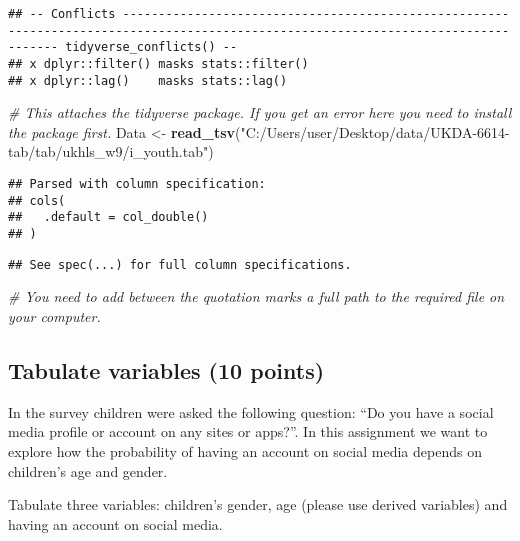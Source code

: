 \documentclass[
]{article}
\newenvironment{Shaded}{\begin{snugshade}}{\end{snugshade}}
\newcommand{\CommentTok}[1]{\textcolor[rgb]{0.56,0.35,0.01}{\textit{#1}}}
\newcommand{\KeywordTok}[1]{\textcolor[rgb]{0.13,0.29,0.53}{\textbf{#1}}}
\newcommand{\NormalTok}[1]{#1}
\newcommand{\StringTok}[1]{\textcolor[rgb]{0.31,0.60,0.02}{#1}}
\begin{document}
\begin{verbatim}
## -- Conflicts ----------------------------------------------------------------------------------------------------------------------------------- tidyverse_conflicts() --
## x dplyr::filter() masks stats::filter()
## x dplyr::lag()    masks stats::lag()
\end{verbatim}

\begin{Shaded}
\begin{Highlighting}[]
\CommentTok{# This attaches the tidyverse package. If you get an error here you need to install the package first. }
\NormalTok{Data <-}\StringTok{ }\KeywordTok{read_tsv}\NormalTok{(}\StringTok{"C:/Users/user/Desktop/data/UKDA-6614-tab/tab/ukhls_w9/i_youth.tab"}\NormalTok{)}
\end{Highlighting}
\end{Shaded}

\begin{verbatim}
## Parsed with column specification:
## cols(
##   .default = col_double()
## )
\end{verbatim}

\begin{verbatim}
## See spec(...) for full column specifications.
\end{verbatim}

\begin{Shaded}
\begin{Highlighting}[]
\CommentTok{# You need to add between the quotation marks a full path to the required file on your computer.}
\end{Highlighting}
\end{Shaded}

\hypertarget{tabulate-variables-10-points}{%
\subsection{Tabulate variables (10
points)}\label{tabulate-variables-10-points}}

In the survey children were asked the following question: ``Do you have
a social media profile or account on any sites or apps?''. In this
assignment we want to explore how the probability of having an account
on social media depends on children's age and gender.

Tabulate three variables: children's gender, age (please use derived
variables) and having an account on social media.
\end{document}
